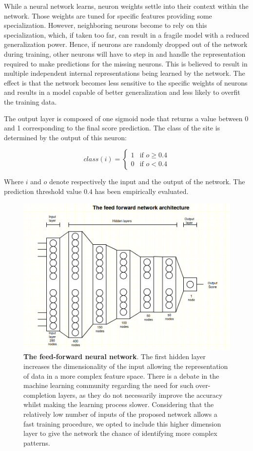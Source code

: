 While a neural network learns, neuron weights settle into their context within the network. Those weights are tuned for specific features providing some specialization. However, neighboring neurons become to rely on this specialization, which, if taken too far, can result in a fragile model with a reduced generalization power. Hence, if neurons are randomly dropped out of the network during training, other neurons will have to step in and handle the representation required to make predictions for the missing neurons. This is believed to result in multiple independent internal representations being learned by the network. The effect is that the network becomes less sensitive to the specific weights of neurons and results in a model capable of better generalization and less likely to overfit the training data.    

The output layer is composed of one sigmoid node that returns a value between 0 and 1 corresponding to the final score prediction. The class of the site is determined by the output of this neuron:

\[class(i) = 
\begin{cases} 
	1 & \text{if } o \geq 0.4 \\
	0 & \text{if } o < 0.4
\end{cases}
\]

Where $i$ and $o$ denote respectively the input and the output of the network. The prediction threshold value $0.4$ has been empirically evaluated. 


\begin{figure}[hbt!]
	\centering
	\includegraphics[width=\textwidth, height=0.52\textheight]{Figures/NN}
	\caption{\textbf{The feed-forward neural network}. The first hidden layer increases the dimensionality of the input allowing the representation of data in a more complex feature space. There is a debate in the machine learning community regarding the need for such over-completion layers, as they do not necessarily improve the accuracy whilst making the learning process slower. Considering that the relatively low number of inputs of the proposed network allows a fast training procedure, we opted to include this higher dimension layer to give the network the chance of identifying more complex patterns.}
	\label{fig:NN}
\end{figure}


